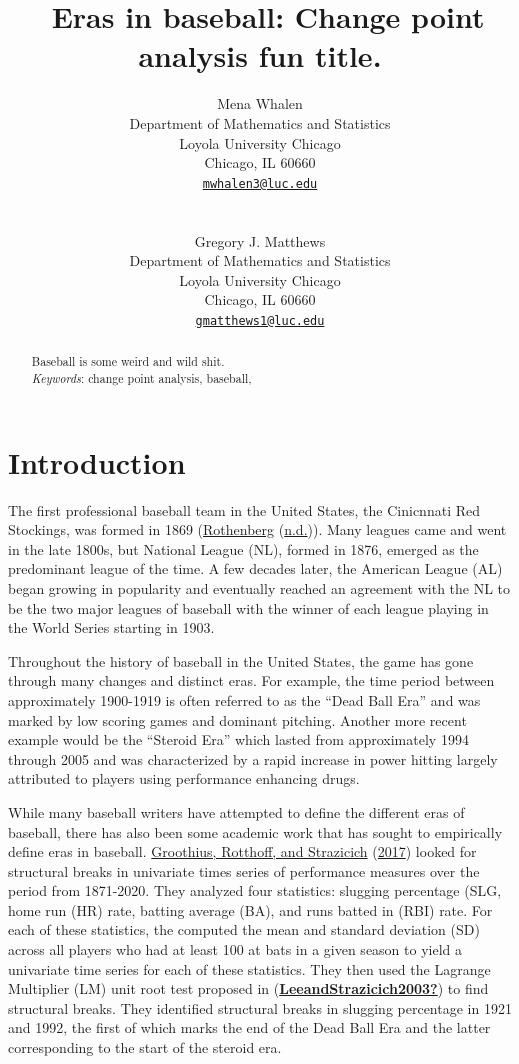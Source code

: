\documentclass[
  12pt,
]{article}
\title{~\Large Eras in baseball: Change point analysis fun title.}
\author{\large Mena Whalen \vspace{-1.1mm}\\
\normalsize Department of Mathematics and Statistics \vspace{-1mm}\\
\normalsize Loyola University Chicago \vspace{-1mm}\\
\normalsize Chicago, IL 60660 \vspace{-1mm}\\
\normalsize \href{mailto:mwhalen3@luc.edu}{\texttt{mwhalen3@luc.edu}}
\vspace{-1mm}\\
\strut \\
\large Gregory J. Matthews \vspace{-1.1mm}\\
\normalsize Department of Mathematics and Statistics \vspace{-1mm}\\
\normalsize Loyola University Chicago \vspace{-1mm}\\
\normalsize Chicago, IL 60660 \vspace{-1mm}\\
\normalsize \href{mailto:gmatthews1@luc.edu}{\texttt{gmatthews1@luc.edu}}
\vspace{-1mm}}
\date{}
\begin{document}
\maketitle
\begin{abstract}
Baseball is some weird and wild shit. \vspace{2mm}\\
\emph{Keywords}: change point analysis, baseball,
\end{abstract}

\newpage

\hypertarget{sec:intro}{%
\section{Introduction}\label{sec:intro}}

The first professional baseball team in the United States, the
Cinicnnati Red Stockings, was formed in 1869
(\protect\hyperlink{ref-BBHOF1869}{Rothenberg}
(\protect\hyperlink{ref-BBHOF1869}{n.d.})). Many leagues came and went
in the late 1800s, but National League (NL), formed in 1876, emerged as
the predominant league of the time. A few decades later, the American
League (AL) began growing in popularity and eventually reached an
agreement with the NL to be the two major leagues of baseball with the
winner of each league playing in the World Series starting in 1903.

Throughout the history of baseball in the United States, the game has
gone through many changes and distinct eras. For example, the time
period between approximately 1900-1919 is often referred to as the
``Dead Ball Era'' and was marked by low scoring games and dominant
pitching. Another more recent example would be the ``Steroid Era'' which
lasted from approximately 1994 through 2005 and was characterized by a
rapid increase in power hitting largely attributed to players using
performance enhancing drugs.

While many baseball writers have attempted to define the different eras
of baseball, there has also been some academic work that has sought to
empirically define eras in baseball.
\protect\hyperlink{ref-Groothius2017}{Groothius, Rotthoff, and
Strazicich} (\protect\hyperlink{ref-Groothius2017}{2017}) looked for
structural breaks in univariate times series of performance measures
over the period from 1871-2020. They analyzed four statistics: slugging
percentage (SLG, home run (HR) rate, batting average (BA), and runs
batted in (RBI) rate. For each of these statistics, the computed the
mean and standard deviation (SD) across all players who had at least 100
at bats in a given season to yield a univariate time series for each of
these statistics. They then used the Lagrange Multiplier (LM) unit root
test proposed in
(\protect\hyperlink{ref-LeeandStrazicich2003}{\textbf{LeeandStrazicich2003?}})
to find structural breaks. They identified structural breaks in slugging
percentage in 1921 and 1992, the first of which marks the end of the
Dead Ball Era and the latter corresponding to the start of the steroid
era.
\end{document}
